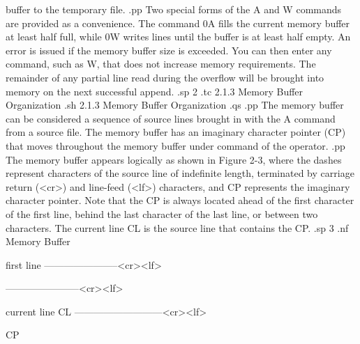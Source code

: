 buffer to the temporary file.
.pp
Two special forms of the A and W commands
are provided as a convenience.  The command 0A fills the current memory
buffer at least half full, while 0W writes lines until the buffer is at least
half empty.  An error is issued if the memory buffer size is exceeded.
You can then enter any command, such as W, that does not increase
memory requirements.  The remainder of any partial line read during the
overflow will be brought into memory on the next successful append.
.sp 2
.tc         2.1.3  Memory Buffer Organization
.sh
2.1.3  Memory Buffer Organization
.qs
.pp
The memory buffer can be considered a sequence of source lines brought
in with the A command from a source file.  The memory buffer has an imaginary
character pointer (CP) that moves throughout the memory buffer
under command of the operator.
.pp
The memory buffer appears logically as shown
in Figure 2-3, where the dashes represent characters of the source line of
indefinite length, terminated by carriage return (<cr>) and line-feed (<lf>)
characters, and CP represents the imaginary character pointer.
Note that the CP is always located ahead of the first character of the
first line, behind the last character of the last line, or between two
characters.  The current line CL is the source line that contains the CP.
.sp 3
.nf
                          Memory Buffer


      first line        -----------------------<cr><lf>


                        -----------------------<cr><lf>


      current line CL   ---------------------------<cr><lf>


                                    CP

